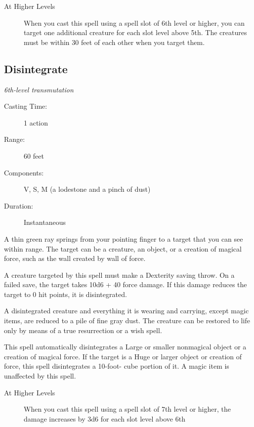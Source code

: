 \documentclass[letterpaper,10pt,twoside,twocolumn,openany]{book}
\begin{document}
\begin{description}
	\item[At Higher Levels] When you cast this spell using a spell slot of 6th level or higher, you can target one additional creature for each slot level above 5th. The creatures must be within 30 feet of each other when you target them.
\end{description}

\subsection{Disintegrate} \hypertarget{Disintegrate}{}
\begin{hangingpar}
	\textit{6th-level transmutation}
\end{hangingpar}
\begin{description}
	\item[Casting Time:] 1 action
	\item[Range:] 60 feet 
	\item[Components:] V, S, M (a lodestone and a pinch of dust) 
	\item[Duration:] Instantaneous 
\end{description}

A thin green ray springs from your pointing finger to a target that you can see within range. The target can be a creature, an object, or a creation of magical force, such as the wall created by wall of force.

A creature targeted by this spell must make a Dexterity saving throw. On a failed save, the target takes 10d6 + 40 force damage. If this damage reduces the target to 0 hit points, it is disintegrated.

A disintegrated creature and everything it is wearing and carrying, except magic items, are reduced to a pile of fine gray dust. The creature can be restored to life only by means of a true resurrection or a wish spell.

This spell automatically disintegrates a Large or smaller nonmagical object or a creation of magical force. If the target is a Huge or larger object or creation of force, this spell disintegrates a 10-foot- cube portion of it. A magic item is unaffected by this spell.

\begin{description}
	\item[At Higher Levels] When you cast this spell using a spell slot of 7th level or higher, the damage increases by 3d6 for each slot level above 6th
\end{description}
\end{document}
